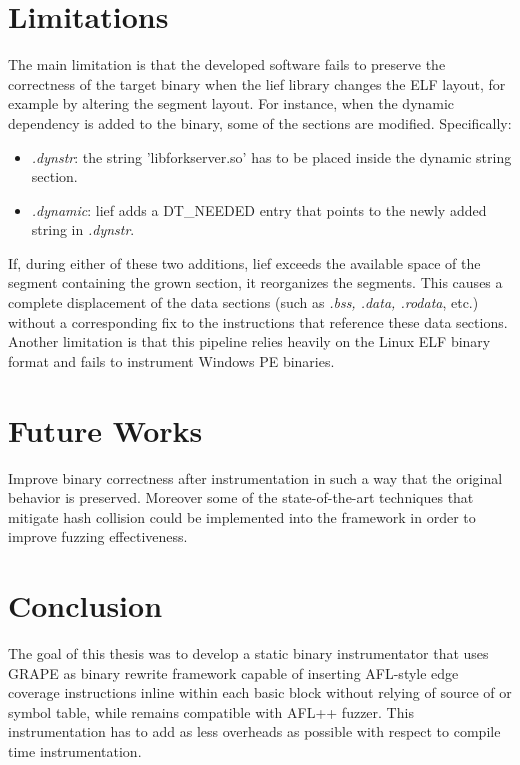 \documentclass{report}
\begin{document}
        \chapter{Limitations}
            The main limitation is that the developed software fails to preserve the correctness of the target binary when the lief library changes the ELF layout, for example by altering the segment layout.
            For instance, when the dynamic dependency is added to the binary, some of the sections are modified. Specifically:
            \begin{itemize}
                \item \textit{.dynstr}: the string 'libforkserver.so' has to be placed inside the dynamic string section.
                \item \textit{.dynamic}: lief adds a DT\_NEEDED entry that points to the newly added string in \textit{.dynstr}.
            \end{itemize}
            If, during either of these two additions, lief exceeds the available space of the segment containing the grown section, it reorganizes the segments.
            This causes a complete displacement of the data sections (such as \textit{.bss, .data, .rodata}, etc.) without a corresponding fix to the instructions that reference these data sections.\\
            Another limitation is that this pipeline relies heavily on the Linux ELF binary format and fails to instrument Windows PE binaries.
        \chapter{Future Works}
            Improve binary correctness after instrumentation in such a way that the original behavior is preserved.
            Moreover some of the state-of-the-art techniques that mitigate hash collision could be implemented into the framework in order to improve fuzzing effectiveness.

        \chapter{Conclusion}

            The goal of this thesis was to develop a static binary instrumentator that uses GRAPE as binary rewrite framework
            capable of inserting AFL-style edge coverage instructions inline within each basic block without relying of source of or symbol table, while
            remains compatible with AFL++ fuzzer. This instrumentation has to add as less overheads as possible with respect to compile time instrumentation.\\
\end{document}
